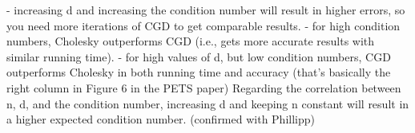 \documentclass{article}
\theoremstyle{plain}
\theoremstyle{definition}
\theoremstyle{remark}
\begin{document}
- increasing d and increasing the condition number will result in higher errors, so you need more iterations of CGD to get comparable results.
- for high condition numbers, Cholesky outperforms CGD (i.e., gets more accurate results with similar running time).
- for high values of d, but low condition numbers, CGD outperforms Cholesky in both running time and accuracy (that's basically the right column in Figure 6 in the PETS paper)
Regarding the correlation between n, d, and the condition number, increasing d and keeping n constant will result in a higher expected condition number.
(confirmed with Phillipp)
\end{document}
